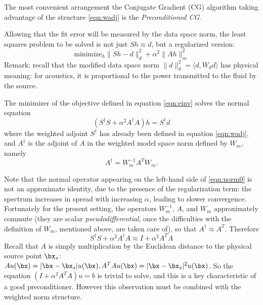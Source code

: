 The most convenient arrangement the Conjugate Gradient (CG) algorithm
taking advantage of the structure \ref{eqn:wadj} is the {\em
  Preconditioned CG}. 

Allowing that the fit error will be measured by the data space norm,
the least squares problem to be solved is not just $Sh \approx d$, but
a regularized version:
\begin{equation}
  \label{eqn:einv}
  \mbox{minimize}_h \|Sh-d\|^2_d + \alpha^2 \|Ah\|^2_m
\end{equation}
Remark: recall that the modified data space norm $\|d\|_d^2 = \langle
d, W_d d\rangle$ has physical meaning: for acoustics, it is
proportional to the power transmitted to the fluid by the source.

The minimizer of the objective defined in equation \ref{eqn:einv}
solves the normal equation
\begin{equation}
  \label{eqn:norm0}
  (S^{\dagger}S + \alpha^2 A^{\dagger}A)h = S^{\dagger}d 
\end{equation}
where the weighted adjoint $S^{\dagger}$ has already been defined in equation \ref{eqn:wadj}, and $A^{\dagger}$ is the adjoint of $A$ in the weighted model space norm defined by $W_m$, namely
\begin{equation}
  \label{eqn:aadj}
  A^{\dagger} = W_m^{-1}A^TW_m.
\end{equation}

Note that the normal operator appearing on the left-hand side of
\ref{eqn:norm0} is not an approximate identity, due to the presence of
the regularization term: the spectrum increases in spread with
increasing $\alpha$, leading to slower convergence. Fortunately for
the present setting, the operators $W_m^{-1}$, $A$, and $W_m$
approximately commute (they are scalar {\em pseudodifferential}, once
the difficulties with the definition of $W_m$, mentioned above, are
taken care of), so that $A^{\dagger} \approx A^T$. Therefore
\begin{equation}
  \label{eqn:normapprox}
  S^{\dagger}S + \alpha^2 A^{\dagger}A \approx I + \alpha^2A^TA
\end{equation}
Recall that $A$ is simply multiplication by the Euclidean distance to
the physical source point $\bx_s$: $A u (\bx) = |\bx-\bx_s|u(\bx),
A^TAu(\bx) = |\bx-\bx_s|^2u(\bx)$. So the equation $(I+\alpha^2
A^TA)u=b$ is trivial to solve, and this is a key characteristic of a
good preconditioner. However this observation must be combined with
the weighted norm structure.

